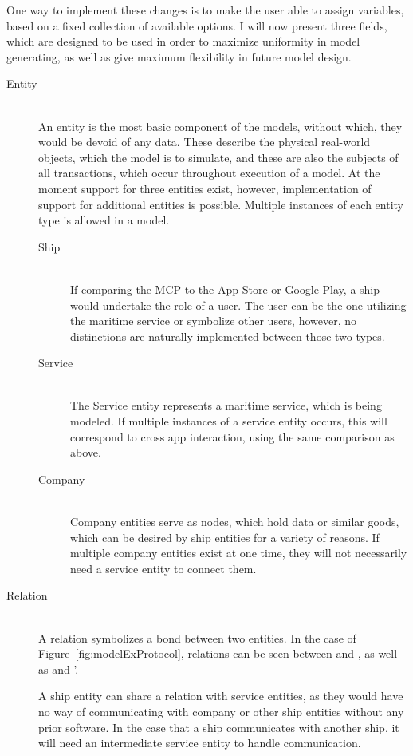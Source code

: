 One way to implement these changes is to make the user able to assign variables, based on a fixed collection of available options. I will now present three fields, which are designed to be used in order to maximize uniformity in model generating, as well as give maximum flexibility in future model design.
\begin{description}
  \item[Entity]\ \\
  An entity is the most basic component of the models, without which, they would be devoid of any data. These describe the physical real-world objects, which the model is to simulate, and these are also the subjects of all transactions, which occur throughout execution of a model. At the moment support for three entities exist, however, implementation of support for additional entities is possible.
  Multiple instances of each entity type is allowed in a model.\newpage
  \begin{description}
    \item[Ship]\ \\
      If comparing the MCP to the App Store or Google Play, a ship would undertake the role of a user. The user can be the one utilizing the maritime service or symbolize other users, however, no distinctions are naturally implemented between those two types.
    \item[Service]\ \\
      The Service entity represents a maritime service, which is being modeled. If multiple instances of a service entity occurs, this will correspond to cross app interaction, using the same comparison as above.
    \item[Company]\ \\
      Company entities serve as nodes, which hold data or similar goods, which can be desired by ship entities for a variety of reasons. If multiple company entities exist at one time, they will not necessarily need a service entity to connect them. 
  \end{description}
  \item[Relation]\ \\
    A relation symbolizes a bond between two entities. In the case of Figure~\ref{fig:modelExProtocol}, relations can be seen between  and , as well as  and '.

    A ship entity can share a relation with service entities, as they would have no way of communicating with company or other ship entities without any prior software. In the case that a ship communicates with another ship, it will need an intermediate service entity to handle communication.


\end{description}
